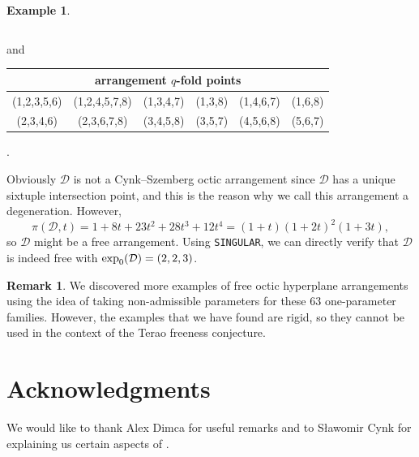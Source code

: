 \documentclass[11pt]{article}
\theoremstyle{plain}
\theoremstyle{definition}
\newtheorem{remark}[thm]{Remark}
\newtheorem{example}[thm]{Example}
\begin{document}
\begin{example}
\begin{center}
\begin{tabular}{ c c c c c  }
\end{tabular}
\end{center}
and 
\begin{center}
\begin{tabular}{ c c c c c c }
\multicolumn{6}{c}{arrangement $q$-fold points} \\ \hline \hline 
 (1,2,3,5,6) & (1,2,4,5,7,8) & (1,3,4,7) & (1,3,8) & (1,4,6,7) & (1,6,8) \\
 (2,3,4,6) & (2,3,6,7,8) & (3,4,5,8) & (3,5,7) & (4,5,6,8) & (5,6,7)
\end{tabular}.
\end{center}
Obviously $\mathcal{D}$ is not a Cynk--Szemberg octic arrangement since $\mathcal{D}$ has a unique sixtuple intersection point, and this is the reason why we call this arrangement a degeneration. However, $$\pi(\mathcal{D},t) = 1+8t+23t^{2}+28t^{3}+12t^{4} = (1+t)(1+2t)^{2}(1+3t),$$
so $\mathcal{D}$ might be a free arrangement. Using \texttt{SINGULAR}, we can directly verify that $\mathcal{D}$ is indeed free with ${\rm exp}_{0}(\mathcal{D}) = (2,2,3)$.
\end{example}
\begin{remark}
We discovered more examples of free octic hyperplane arrangements using the idea of taking non-admissible parameters for these $63$ one-parameter families. However, the examples that we have found are rigid, so they cannot be used in the context of the Terao freeness conjecture.
\end{remark}
\section*{Acknowledgments}
We would like to thank Alex Dimca for useful remarks and to S\l awomir Cynk for explaining us certain aspects of \cite{Cynks}.
\end{document}
